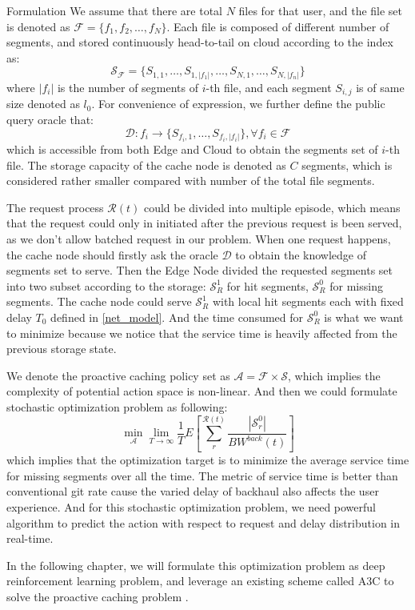 \documentclass{article}
\begin{document}
\begin{section}{Formulation}
    We assume that there are total $N$ files for that user, and the file set is denoted as $\mathcal{F} = \{f_1, f_2, \dots, f_N\}$. Each file is composed of different number of segments, and stored continuously head-to-tail on cloud according to the index as:
    $$
    \mathcal{S_F} = \{S_{1,1}, \dots, S_{1,|f_1|}, \dots, S_{N,1}, \dots, S_{N,|f_n|}\}
    $$
    where $|f_i|$ is the number of segments of $i$-th file, and each segment $S_{i,j}$ is of same size denoted as $l_0$. For convenience of expression, we further define the public query oracle that:
    $$
    \mathcal{D}:f_i \to \{S_{f_i,1}, \dots, S_{f_i,|f_i|}\}, \forall f_i \in \mathcal{F}
    $$
    which is accessible from both Edge and Cloud to obtain the segments set of $i$-th file. The storage capacity of the cache node is denoted as $C$ segments, which is considered rather smaller compared with number of the total file segments.

    The request process $\mathcal{R}(t)$ could be divided into multiple episode, which means that the request could only in initiated after the previous request is been served, as we don't allow batched request in our problem. When one request happens, the cache node should firstly ask the oracle $\mathcal{D}$ to obtain the knowledge of segments set to serve. Then the Edge Node divided the requested segments set into two subset according to the storage: $\mathcal{S}_R^{1}$ for hit segments, $\mathcal{S}_R^{0}$ for missing segments.
    The cache node could serve $\mathcal{S}_R^{1}$ with local hit segments each with fixed delay $T_0$ defined in \ref{net_model}. And the time consumed for $\mathcal{S}_R^{0}$ is what we want to minimize because we notice that the service time is heavily affected from the previous storage state.

    We denote the proactive caching policy set as $\mathcal{A} =\mathcal{F} \times \mathcal{S}$, which implies the complexity of potential action space is non-linear. And then we could formulate stochastic optimization problem as following:
    $$
    \min_{\mathcal{A}} \lim_{T \to \infty} \frac{1}{T} E[\sum_r^{\mathcal{R}(t)} \frac{|\mathcal{S}_{r}^{0}|}{BW^{back}(t)}]
    $$
    which implies that the optimization target is to minimize the average service time for missing segments over all the time. The metric of service time is better than conventional git rate cause the varied delay of backhaul also affects the user experience. And for this stochastic optimization problem, we need powerful algorithm to predict the action with respect to request and delay distribution in real-time.

    In the following chapter, we will formulate this optimization problem as deep reinforcement learning problem, and leverage an existing scheme called A3C to solve the proactive caching problem \cite{a3c}.
\end{section}
\end{document}

